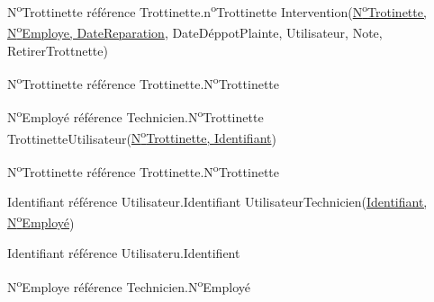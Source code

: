 \documentclass{article}
\newcommand\tab[1][1cm]{\hspace*{#1}}
\begin{document}
\tab N\textsuperscript{o}Trottinette référence Trottinette.n\textsuperscript{o}Trottinette
 \bigbreak
 Intervention(\underline{N\textsuperscript{o}Trotinette, N\textsuperscript{o}Employe, DateReparation}, DateDéppotPlainte, Utilisateur, Note, RetirerTrottnette)
 
 \tab N\textsuperscript{o}Trottinette référence Trottinette.N\textsuperscript{o}Trottinette
 
\tab N\textsuperscript{o}Employé référence Technicien.N\textsuperscript{o}Trottinette
\bigbreak
TrottinetteUtilisateur(\underline{N\textsuperscript{o}Trottinette, Identifiant})

\tab N\textsuperscript{o}Trottinette référence Trottinette.N\textsuperscript{o}Trottinette

\tab Identifiant référence Utilisateur.Identifiant
\bigbreak
UtilisateurTechnicien(\underline{Identifiant, N\textsuperscript{o}Employé})

\tab Identifiant référence Utilisateru.Identifient

\tab N\textsuperscript{o}Employe référence Technicien.N\textsuperscript{o}Employé
\end{document}
